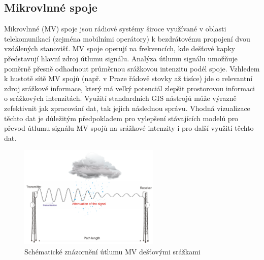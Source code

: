 \documentclass[a4paper,12pt]{article}
\begin{document}




\subsection{Mikrovlnné spoje}
Mikrovlnné (MV) spoje jsou rádiové systémy široce využívané v oblasti telekomunikací (zejména 
mobilními operátory) k bezdrátovému propojení dvou vzdálených stanovišť. MV spoje operují na 
frekvencích, kde dešťové kapky představují hlavní zdroj útlumu signálu. Analýza útlumu signálu 
umožňuje poměrně přesně odhadnout průměrnou srážkovou intenzitu podél spoje. Vzhledem 
k hustotě sítě MV spojů (např. v Praze řádově stovky až tisíce) jde o relevantní zdroj srážkové 
informace, který má velký potenciál zlepšit prostorovou informaci o srážkových intenzitách. Využití 
standardních GIS nástrojů může výrazně zefektivnit jak zpracování dat, tak jejich následnou správu. 
Vhodná vizualizace těchto dat je důležitým předpokladem pro vylepšení stávajících modelů pro 
převod útlumu signálu MV spojů na srážkové intenzity i pro další využití těchto dat. 
\begin{figure}[h!]
    \centering
    \includegraphics[width=0.6\textwidth]{./img/srazky/microwave_link.png}
    \caption[Rušení radaru]{\centering Schématické znázornění útlumu MV dešťovými srážkami  \footnotemark }
 \end{figure}   
    
\end{document}
